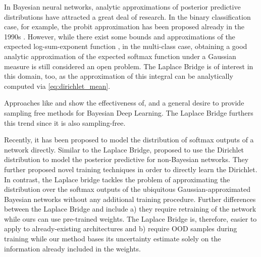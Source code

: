 

In Bayesian neural networks, analytic approximations of posterior predictive distributions have attracted a great deal of research. In the binary classification case, for example, the probit approximation has been proposed already in the 1990s \citep{spiegelhalter1990sequential,mackay1992evidence}. However, while there exist some bounds \citep{michalis2016one} and approximations of the expected log-sum-exponent function \citep{ahmed2007tight,braun2010variational}, in the multi-class case, obtaining a good analytic approximation of the expected softmax function under a Gaussian measure is still considered an open problem. The Laplace Bridge is of interest in this domain, too, as the approximation of this integral can be analytically computed via \eqref{eq:dirichlet_mean}.

Approaches like \cite{DeterministicVI2018} and \cite{haussmann2019BEDLwithPAC} show the effectiveness of, and a general desire to provide sampling free methods for Bayesian Deep Learning. The Laplace Bridge furthers this trend since it is also sampling-free.

Recently, it has been proposed to model the distribution of softmax outputs of a network directly. Similar to the Laplace Bridge, \citet{NIPS2018PriorNetworks,NIPS2019PriorNetworks_improved,NIPS2018EvidentialDL} proposed to use the Dirichlet distribution to model the posterior predictive for non-Bayesian networks. They further proposed novel training techniques in order to directly learn the Dirichlet. In contrast, the Laplace bridge tackles the problem of approximating the distribution over the softmax outputs of the ubiquitous Gaussian-approximated Bayesian networks \citep[etc]{Graves2011VB,Blundell2015WeightUI,louizos_structured_2016,sun_learning_2017} without any additional training procedure. Further differences between the Laplace Bridge and  \cite{NIPS2018PriorNetworks,NIPS2019PriorNetworks_improved,NIPS2018EvidentialDL} include a) they require retraining of the network while ours can use pre-trained weights. The Laplace Bridge is, therefore, easier to apply to already-existing architectures and b) \cite{NIPS2018PriorNetworks,NIPS2019PriorNetworks_improved} require OOD samples during training while our method bases its uncertainty estimate solely on the information already included in the weights.


